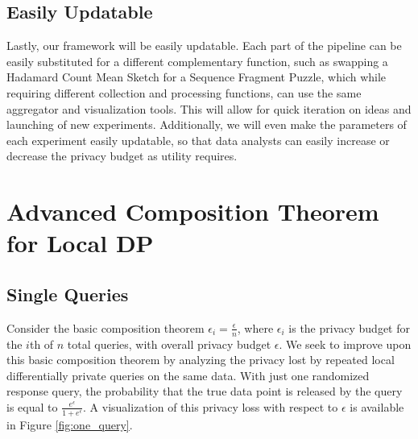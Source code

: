 \documentclass[12pt]{article}
\theoremstyle{definition}
\begin{document}
\subsection{Easily Updatable}

\noindent

Lastly, our framework will be easily updatable. Each part of the pipeline can be easily substituted for a different complementary function, such as swapping a Hadamard Count Mean Sketch for a Sequence Fragment Puzzle, which while requiring different collection and processing functions, can use the same aggregator and visualization tools. This will allow for quick iteration on ideas and launching of new experiments. Additionally, we will even make the parameters of each experiment easily updatable, so that data analysts can easily increase or decrease the privacy budget as utility requires.

\section{Advanced Composition Theorem for Local DP}
\label{sec:advanced_comp}

\subsection{Single Queries}

\noindent

Consider the basic composition theorem $\epsilon_i = \frac{\epsilon}{n}$, where $\epsilon_i$ is the privacy budget for the $i$th of $n$ total queries, with overall privacy budget $\epsilon$. We seek to improve upon this basic composition theorem by analyzing the privacy lost by repeated local differentially private queries on the same data. With just one randomized response query, the probability that the true data point is released by the query is equal to $\frac{e^\epsilon}{1 + e^\epsilon}$. A visualization of this privacy loss with respect to $\epsilon$ is available in Figure \ref{fig:one_query}.
\end{document}

